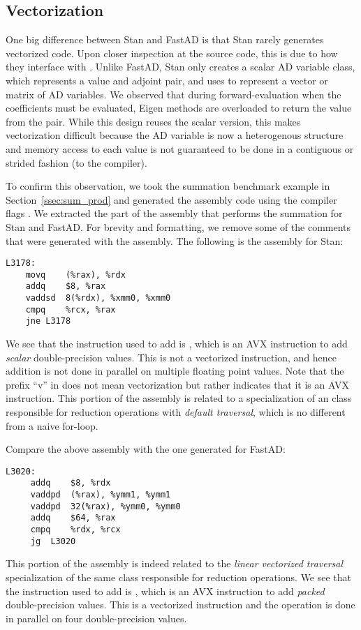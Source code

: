 \subsection{Vectorization}

One big difference between Stan and FastAD is that 
Stan rarely generates vectorized code.
Upon closer inspection at the source code, 
this is due to how they interface with .
Unlike FastAD, Stan only creates a scalar AD variable class,
which represents a value and adjoint pair,
and uses 
to represent a vector or matrix of AD variables.
We observed that during forward-evaluation when the coefficients must be evaluated,
Eigen methods are overloaded to return the value from the pair.
While this design reuses the scalar version,
this makes vectorization difficult because the AD variable
is now a heterogenous structure and memory access to each value
is not guaranteed to be done in a contiguous or strided fashion
(to the compiler).

To confirm this observation, we took the
summation benchmark example in Section~\ref{ssec:sum_prod}
and generated the assembly code using the compiler flags .
We extracted the part of the assembly that performs the summation for Stan and FastAD.\@
For brevity and formatting, 
we remove some of the comments that were generated with the assembly.
The following is the assembly for Stan:
\begin{lstlisting}[style=customasm]
L3178:
    movq    (%rax), %rdx
    addq    $8, %rax
    vaddsd  8(%rdx), %xmm0, %xmm0 
    cmpq    %rcx, %rax 
    jne L3178
\end{lstlisting}
We see that the instruction used to add is ,
which is an AVX instruction to add \emph{scalar} double-precision values.
This is not a vectorized instruction, and hence addition is not done in parallel
on multiple floating point values.
Note that the prefix ``v'' in  does not mean vectorization but 
rather indicates that it is an AVX instruction.
This portion of the assembly is related to a specialization of an  class 
responsible for reduction operations with \emph{default traversal},
which is no different from a naive for-loop.

Compare the above assembly with the one generated for FastAD:
\begin{lstlisting}[style=customasm]
 L3020:
     addq    $8, %rdx
     vaddpd  (%rax), %ymm1, %ymm1   
     vaddpd  32(%rax), %ymm0, %ymm0 
     addq    $64, %rax
     cmpq    %rdx, %rcx 
     jg  L3020 
\end{lstlisting}
This portion of the assembly is indeed related to the \emph{linear vectorized traversal}
specialization of the same  class responsible for reduction operations.
We see that the instruction used to add is ,
which is an AVX instruction to add \emph{packed} double-precision values.
This is a vectorized instruction and the operation is done in parallel
on four double-precision values.

